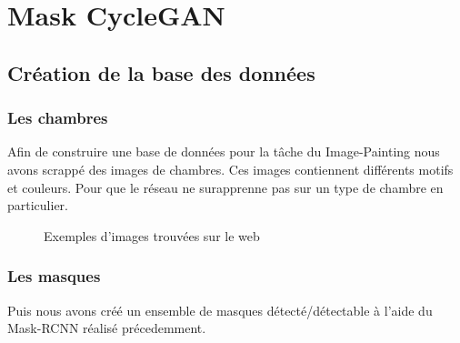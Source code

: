 \chapter{Mask CycleGAN}

\section{Création de la base des données}

\subsection{Les chambres}

Afin de construire une base de données pour la tâche du Image-Painting nous avons scrappé des images de chambres. Ces images contiennent différents motifs et couleurs. Pour que le réseau ne surapprenne pas sur un type de chambre en particulier.

\begin{figure}[!h]
    \centering
    \qquad
    \caption{Exemples d'images trouvées sur le web}%
    \label{fig:example}%
\end{figure}

\subsection{Les masques}
Puis nous avons créé un ensemble de masques détecté/détectable à l'aide du Mask-RCNN réalisé précedemment.

